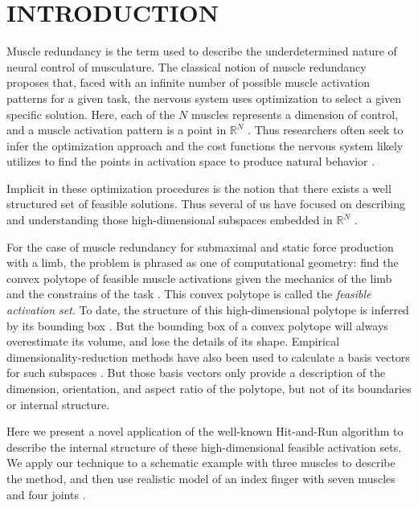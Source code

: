 
\section{INTRODUCTION}

Muscle redundancy is the term used to describe the underdetermined nature of neural control of musculature.
The classical notion of muscle redundancy  proposes that, faced with an infinite number of possible muscle activation patterns for a given task, the nervous system uses optimization to select a given specific solution.
Here, each of the $N$ muscles represents a dimension of control, and a muscle activation pattern is a point in $\mathbb{R}^N$ \cite{Valero-Cuevas1998Large}.
Thus researchers often seek to infer the optimization approach and the cost functions the nervous system likely utilizes to find the points in activation space to produce natural behavior \cite{Chao1978Graphical,Prilutsky2000Muscle,scott2004optimal,todorov2002optimal,crowninshield1981physiologically,higginson2005simulated}. 


Implicit in these optimization procedures is the notion that there exists a well structured set of feasible solutions. Thus several of us have focused on describing and understanding those high-dimensional subspaces  embedded in $\mathbb{R}^N$ \cite{kutch2011muscle,kutch2012challenges,sohn2013cat_bounding_box,Valero-Cuevas1998Large,Valero-Cuevas2015high-dimensional}.

For the case of muscle redundancy for submaximal and static force production with a limb,  the problem is phrased as one of computational geometry: find the convex polytope of feasible muscle activations given the mechanics of the limb and the constrains of the task \cite{avis1992Pivoting,Valero-Cuevas1998Large,Valero-Cuevas2009mathematical,Valero-Cuevas2015high-dimensional}.
This convex polytope is called the \emph{feasible activation set}.
To date, the structure of this high-dimensional polytope is inferred by its bounding box  \cite{kutch2011muscle,sohn2013cat_bounding_box,Valero-Cuevas2015high-dimensional}.
But the bounding box of a convex polytope will always overestimate its volume, and lose the details of its shape.
Empirical dimensionality-reduction methods have also been used to calculate a basis vectors for such subspaces \cite{Clewley2008Estimating,davella2005shared,krishnamoorthy2003muscle}.
But those basis vectors only provide a description of the dimension, orientation, and aspect ratio of the polytope, but not of its boundaries or internal  structure.

Here we present a novel application of the well-known Hit-and-Run algorithm \cite{smith1984efficient} to describe the internal structure of these high-dimensional feasible activation sets. We apply our technique to a schematic example with three muscles to describe the method, and then use realistic model of an index finger with seven muscles and four joints \cite{Valero-Cuevas1998Large}.